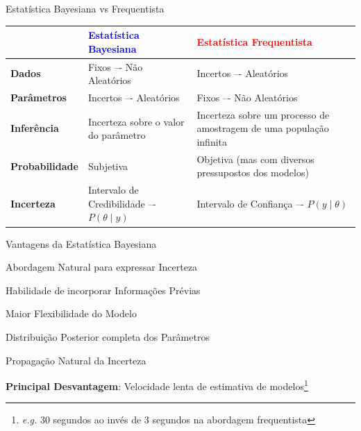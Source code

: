 \documentclass[aspectratio=169]{beamer}                    %
\begin{document}
\begin{frame}{Estatística Bayesiana vs Frequentista}
    \begin{table}[h!]
        \small
        \begin{tabular}{|l|p{}|p{}|}
        \toprule
                                & \textcolor{blue}{\textbf{Estatística Bayesiana}} & \textcolor{red}{\textbf{Estatística Frequentista}}                   \\ \midrule
        \textbf{Dados}          & Fixos –- Não Aleatórios                          & Incertos –- Aleatórios                                               \\ \midrule
        \textbf{Parâmetros}     & Incertos –- Aleatórios                           & Fixos –- Não Aleatórios                                              \\ \midrule
        \textbf{Inferência}     & Incerteza sobre o valor do parâmetro             & Incerteza sobre um processo de amostragem de uma população infinita  \\ \midrule
        \textbf{Probabilidade}  & Subjetiva                                        & Objetiva (mas com diversos pressupostos dos modelos)                 \\ \midrule
        \textbf{Incerteza}      & Intervalo de Credibilidade –- $P(\theta \mid y)$ & Intervalo de Confiança –- $P(y \mid \theta)$                         \\
        \bottomrule
        \end{tabular}
    \end{table}
\end{frame}

\begin{frame}{Vantagens da Estatística Bayesiana}
    \begin{vfilleditems}
        \item Abordagem Natural para expressar Incerteza
        \item Habilidade de incorporar Informações Prévias
        \item Maior Flexibilidade do Modelo
        \item Distribuição Posterior completa dos Parâmetros
        \item Propagação Natural da Incerteza
    \end{vfilleditems}
    \small \textbf{Principal Desvantagem}: Velocidade lenta de estimativa de modelos\footnote{\textit{e.g.} 30 segundos ao invés de 3 segundos na abordagem frequentista}
\end{frame}
\end{document}
